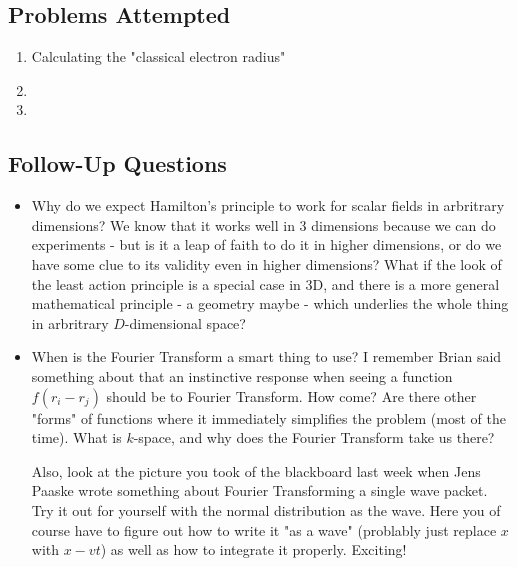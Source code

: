 \subsection*{Problems Attempted}
\begin{enumerate}
    \item Calculating the "classical electron radius"
    \item {}
    \item {}
\end{enumerate}

\subsection*{Follow-Up Questions}
\begin{itemize}
    \item Why do we expect Hamilton's principle to work for scalar fields in arbritrary dimensions? We know that it works well in 3 dimensions because we can do experiments - but is it a leap of faith to do it in higher dimensions, or do we have some clue to its validity even in higher dimensions? What if the look of the least action principle is a special case in 3D, and there is a more general mathematical principle - a geometry maybe - which underlies the whole thing in arbritrary \(D\)-dimensional space? 
    \item When is the Fourier Transform a smart thing to use? I remember Brian said something about that an instinctive response when seeing a function \(f(r_i - r_j)\) should be to Fourier Transform. How come? Are there other "forms" of functions where it immediately simplifies the problem (most of the time). What is \(k\)-space, and why does the Fourier Transform take us there? 
    
    Also, look at the picture you took of the blackboard last week when Jens Paaske wrote something about Fourier Transforming a single wave packet. Try it out for yourself with the normal distribution as the wave. Here you of course have to figure out how to write it "as a wave" (problably just replace \(x\) with \(x - vt\)) as well as how to integrate it properly. Exciting!
\end{itemize}

